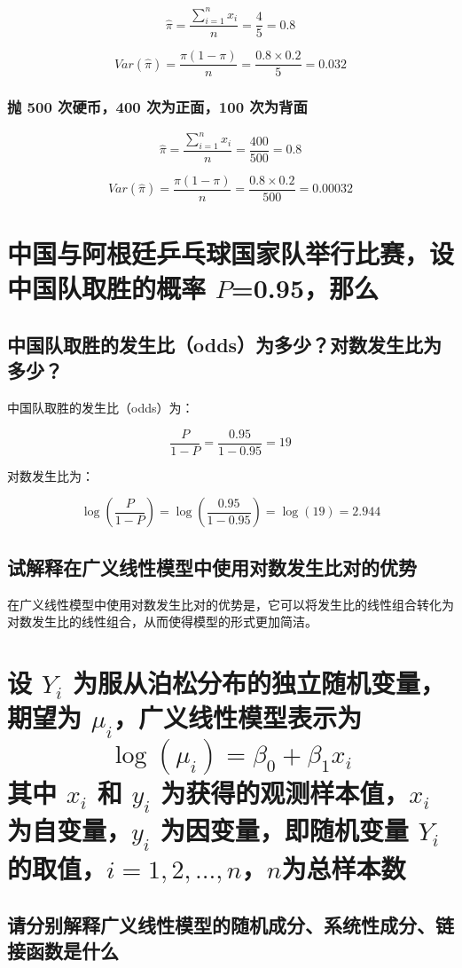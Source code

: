 \documentclass[]{article}
\newcommand\df[2]{\dfrac{#1}{#2}}
\begin{document}
$$\hat{\pi}=\df{\sum_{i=1}^nx_i}{n}=\df{4}{5}=0.8$$

$$Var(\hat{\pi})=\df{\pi(1-\pi)}{n}=\df{0.8\times0.2}{5}=0.032$$

\subsubsection{抛 500 次硬币，400 次为正面，100 次为背面}

$$\hat{\pi}=\df{\sum_{i=1}^nx_i}{n}=\df{400}{500}=0.8$$

$$Var(\hat{\pi})=\df{\pi(1-\pi)}{n}=\df{0.8\times0.2}{500}=0.00032$$

\section{中国与阿根廷乒乓球国家队举行比赛，设中国队取胜的概率 $P$=0.95，那么}

\subsection{中国队取胜的发生比（odds）为多少？对数发生比为多少？}

中国队取胜的发生比（odds）为：

$$\df{P}{1-P}=\df{0.95}{1-0.95}=19$$

对数发生比为：

$$\log(\df{P}{1-P})=\log(\df{0.95}{1-0.95})=\log(19)=2.944$$

\subsection{试解释在广义线性模型中使用对数发生比对的优势}

在广义线性模型中使用对数发生比对的优势是，它可以将发生比的线性组合转化为对数发生比的线性组合，从而使得模型的形式更加简洁。

\section{设 $Y_i$ 为服从泊松分布的独立随机变量，期望为 $\mu_i$，广义线性模型表示为 $$\log(\mu_i)=\beta_0+\beta_1x_i$$ 其中 $x_i$ 和 $y_i$ 为获得的观测样本值，$x_i$ 为自变量，$y_i$ 为因变量，即随机变量 $Y_i$ 的取值，$i=1,2,...,n$，$n$为总样本数 }

\subsection{请分别解释广义线性模型的随机成分、系统性成分、链接函数是什么}
\end{document}
